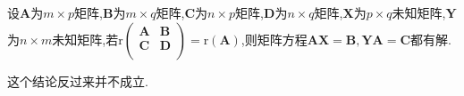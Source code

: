\documentclass[../../main.tex]{subfiles}%
\begin{document}
\begin{corollary}\label{corollary:分块矩阵的秩与单个块的秩相同则矩阵方阵有解}
设$\boldsymbol{A}$为\(m\times p\)矩阵,$\boldsymbol{B}$为\(m\times q\)矩阵,$\boldsymbol{C}$为\(n\times p\)矩阵,$\boldsymbol{D}$为\(n\times q\)矩阵,\(\boldsymbol{X}\)为\(p\times q\)未知矩阵,\(\boldsymbol{Y}\)为\(n\times m\)未知矩阵,若\(\mathrm{r}\left( \begin{matrix}
\boldsymbol{A}&		\boldsymbol{B}\\
\boldsymbol{C}&		\boldsymbol{D}\\
\end{matrix} \right) =\mathrm{r}\left( \boldsymbol{A} \right)  \),则矩阵方程\(\boldsymbol{AX}=\boldsymbol{B},\boldsymbol{YA}=\boldsymbol{C}\)都有解.
\end{corollary}
\begin{remark}
这个结论反过来并不成立.
\end{remark}
\end{document}
